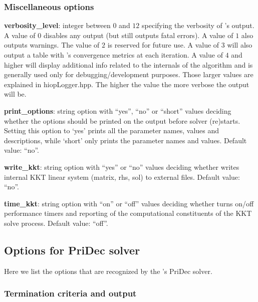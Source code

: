\subsubsection{Miscellaneous options}

\noindent \textbf{verbosity\_level}: integer between $0$ and $12$ specifying the verbosity of \Hi's output. A value of $0$ disables any output (but still outputs fatal errors). A value of $1$ also outputs warnings. The value of $2$ is reserved for future use. A value of $3$ will also output a table with \Hi's convergence metrics at each iteration. A value of $4$ and higher will display additional info related to the internals of the algorithm and is generally used only for debugging/development purposes. Those larger values are explained in hiopLogger.hpp. The higher the value the more verbose the output will be.
\medskip

\noindent \textbf{print\_options}: string option with ``yes'', ``no'' or ``short'' values deciding whether the options should be printed on the output before solver (re)starts. Setting this option to `yes' prints all the parameter names, values and descriptions, while `short' only prints the parameter names and values. Default value: ``no''.
\medskip

\noindent \textbf{write\_kkt}: string option with ``yes'' or ``no'' values deciding whether \Hi writes internal KKT linear system (matrix, rhs, sol) to external files. Default value: ``no''.
\medskip

\noindent \textbf{time\_kkt}: string option with ``on'' or ``off'' values deciding whether \Hi turns on/off performance timers and reporting of the computational constituents of the KKT solve process. Default value: ``off''.
\medskip



















\subsection{Options for PriDec solver}

Here we list the options that are recognized by the \Hi's PriDec solver.
 \subsubsection{Termination criteria and output}

